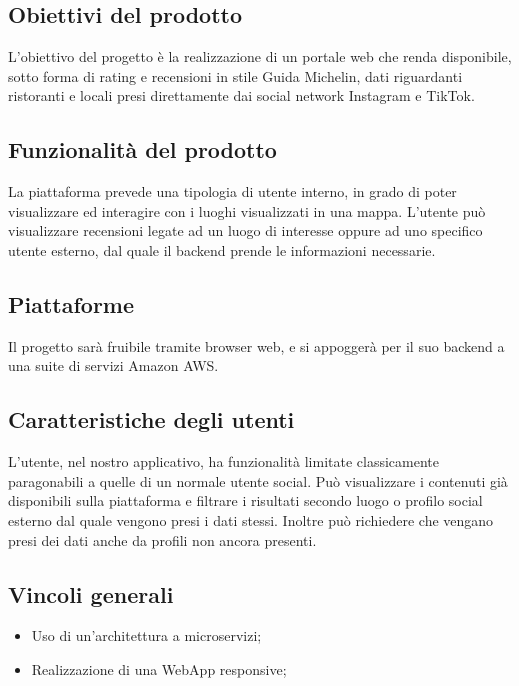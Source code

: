 \subsection{Obiettivi del prodotto}
L'obiettivo del progetto è la realizzazione di un portale web che renda disponibile, 
sotto forma di rating e recensioni in stile Guida Michelin, dati riguardanti ristoranti 
e locali presi direttamente dai social network Instagram e TikTok.

\subsection{Funzionalità del prodotto}
La piattaforma prevede una tipologia di utente interno, in grado di poter visualizzare ed interagire con i luoghi visualizzati in una mappa. 
L’utente può visualizzare recensioni legate ad un luogo di interesse oppure ad uno specifico utente esterno, dal quale il backend prende le informazioni necessarie.

\subsection{Piattaforme}
Il progetto sarà fruibile tramite browser web, e si appoggerà per il suo backend a una suite di servizi Amazon AWS.

\subsection{Caratteristiche degli utenti}
L'utente, nel nostro applicativo, ha funzionalità limitate classicamente paragonabili a quelle di un normale utente social.
Può visualizzare i contenuti già disponibili sulla piattaforma e filtrare i risultati secondo luogo o profilo social esterno dal quale vengono presi i dati stessi.
Inoltre può richiedere che vengano presi dei dati anche da profili non ancora presenti.

\subsection{Vincoli generali}
\begin{itemize}
	\item Uso di un'architettura a microservizi;
	\item Realizzazione di una WebApp responsive;
\end{itemize}
